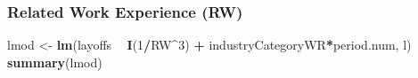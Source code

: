 \documentclass[
]{article}
\newenvironment{Shaded}{\begin{snugshade}}{\end{snugshade}}
\newcommand{\DecValTok}[1]{\textcolor[rgb]{0.00,0.00,0.81}{#1}}
\newcommand{\KeywordTok}[1]{\textcolor[rgb]{0.13,0.29,0.53}{\textbf{#1}}}
\newcommand{\NormalTok}[1]{#1}
\newcommand{\OperatorTok}[1]{\textcolor[rgb]{0.81,0.36,0.00}{\textbf{#1}}}
\newcommand{\StringTok}[1]{\textcolor[rgb]{0.31,0.60,0.02}{#1}}
\begin{document}
\hypertarget{related-work-experience-rw-1}{%
\subsubsection{Related Work Experience
(RW)}\label{related-work-experience-rw-1}}

\begin{Shaded}
\begin{Highlighting}[]
\NormalTok{lmod <-}\StringTok{ }\KeywordTok{lm}\NormalTok{(layoffs }\OperatorTok{~}\StringTok{ }\KeywordTok{I}\NormalTok{(}\DecValTok{1}\OperatorTok{/}\NormalTok{RW}\OperatorTok{^}\DecValTok{3}\NormalTok{) }\OperatorTok{+}\StringTok{ }\NormalTok{industryCategoryWR}\OperatorTok{*}\NormalTok{period.num, l)}
\KeywordTok{summary}\NormalTok{(lmod)}
\end{Highlighting}
\end{Shaded}
\end{document}
